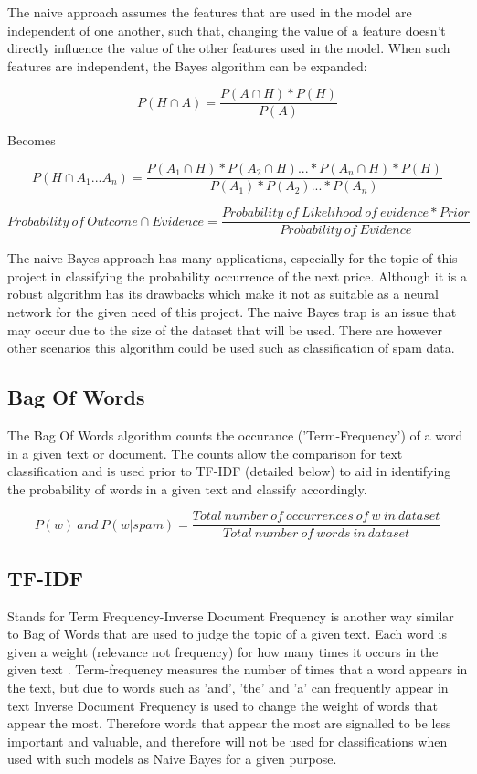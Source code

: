 \documentclass[oneside, 12pt]{article}
\begin{document}
			The naive approach assumes the features that are used in the model are independent of one another, such that, changing the value of a feature doesn't directly influence the value of the other features used in the model. When such features are independent, the Bayes algorithm can be expanded:
			
			\[P(H\cap A) = \frac{P(A\cap H) * P(H)}{P(A)} \]
			
			\begin{center}
				Becomes
			\end{center}
			
			\[P(H\cap A_1 ... A_n) = \frac{P(A_1\cap H) * P(A_2\cap H) ... * P(A_n\cap H) * P(H)}{P(A_1) * P(A_2) ... * P(A_n)} \]
			
			\[Probability \ of \ Outcome \cap Evidence = \frac{Probability \ of \ Likelihood \ of \ evidence * Prior}{Probability \ of \ Evidence} \]
			
			The naive Bayes approach has many applications, especially for the topic of this project in classifying the probability occurrence of the next price. Although it is a robust algorithm has its drawbacks which make it not as suitable as a neural network for the given need of this project. The naive Bayes trap is an issue that may occur due to the size of the dataset that will be used. There are however other scenarios this algorithm could be used such as classification of spam data.\cite{32}
			
			\subsection{Bag Of Words}
			The Bag Of Words algorithm counts the occurance ('Term-Frequency') of a word in a given text or document. The counts allow the comparison for text classification and is used prior to TF-IDF (detailed below) to aid in identifying the probability of words in a given text and classify accordingly. \cite{33}
			
			\[P(w) \ and\ P(w|spam) = \frac{Total\ number\ of\ occurrences\ of\ w\ in\ dataset}{Total\ number\ of\ words\ in\ dataset}\]
			
			\subsection{TF-IDF}
			Stands for Term Frequency-Inverse Document Frequency is another way similar to Bag of Words that are used to judge the topic of a given text. Each word is given a weight (relevance not frequency) for how many times it occurs in the given text \cite{33}. 
			Term-frequency measures the number of times that a word appears in the text, but due to words such as 'and', 'the' and 'a' can frequently appear in text Inverse Document Frequency is used to change the weight of words that appear the most. Therefore words that appear the most are signalled to be less important and valuable, and therefore will not be used for classifications when used with such models as Naive Bayes for a given purpose. \cite{33}
			\newline
			
\end{document}
